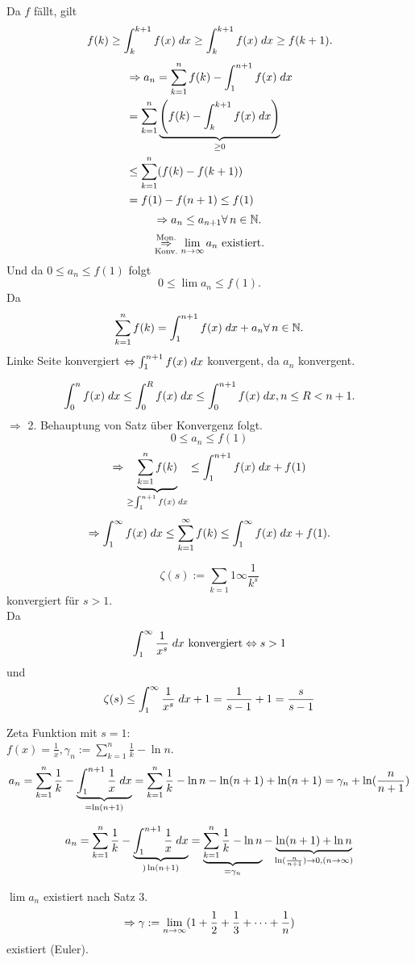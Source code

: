 \documentclass[../ana2.tex]{subfiles}
\begin{document}
\begin{bew}
    Da \(f\) fällt, gilt 
    \[ f(k) \geq \integral{f(x)}{k}{k+1} 
    \geq \integral{f(x)}{k}{k+1} 
    \geq f(k+1). \]
    \begin{align*}
        &\Rightarrow a_n = \sum_{k=1}^n f(k) 
        - \integral{f(x)}{1}{n+1} \\
        &= \sum_{k=1}^n 
        \underbrace{\left( f(k) - \integral{f(x)}{k}{k+1} \right)}
        _{\geq 0} \\
        &\leq \sum_{k=1}^n (f(k)-f(k+1)) \\
        &= f(1) - f(n+1) \leq f(1)
    \end{align*}
    \[ \Rightarrow a_n \leq a_{n+1} \forall n\in\N. \]
    \[ \overundersett{Mon.}{Konv.}{\Rightarrow} 
    \limes{n} a_n \text{ existiert}. \]
    Und da \( 0 \leq a_n \leq f(1) \) folgt 
    \[ 0 \leq \lim a_n \leq f(1). \]
    Da \[ \sum_{k=1}^n f(k) 
    = \integral{f(x)}{1}{n+1} + a_n \forall n\in\N. \]
    Linke Seite konvergiert 
    \( \Leftrightarrow \integral{f(x)}{1}{n+1} \) konvergent, 
    da \( a_n \) konvergent.

    \[ \integral{f(x)}{0}{n} \leq \integral{f(x)}{0}{R} 
    \leq \integral{f(x)}{0}{n+1}, n\leq R < n+1. \]
    \( \Rightarrow \) 2. Behauptung von Satz über Konvergenz 
    folgt.
    \[ 0 \leq a_n \leq f(1) \]
    \[ \Rightarrow \underbrace{\sum_{k=1}^n f(k)}
    _{\geq \integral{f(x)}{1}{n+1}}
    \leq \integral{f(x)}{1}{n+1} + f(1) \]
    \[ \Rightarrow \integral{f(x)}{1}{\infty} 
    \leq \sum_{k=1}^\infty f(k) 
    \leq \integral{f(x)}{1}{\infty} + f(1). \]
\end{bew}
\begin{bsp}
    \[ \zeta(s) := \sum_{k=1}1\infty \frac{1}{k^s} \]
    konvergiert für \(s>1\). \\
    Da
    \[ \integral{\frac{1}{x^s}}{1}{\infty} \text{ konvergiert}
    \Leftrightarrow s > 1  \]
    und 
    \[ \zeta(s) \leq \integral{\frac{1}{x^s}}{1}{\infty} + 1
    = \frac{1}{s-1} + 1 = \frac{s}{s-1} \]
\end{bsp}
\begin{bsp}
    Zeta Funktion mit \(s = 1\): \\
    \( f(x) = \frac{1}{x}, 
    \gamma_n := \sum_{k=1}^n \frac{1}{k} - \ln n \).
    \[ a_n = \sum_{k=1}^n \frac{1}{k} 
    - \underbrace{\integral{\frac{1}{x}}{1}{n+1}}_{=\ln(n+1)} 
    = \sum_{k=1}^n \frac{1}{k} - \ln n 
    - \ln(n+1) + \ln(n+1) = \gamma_n + \ln(\frac{n}{n+1}) \]

    \[ a_n = \sum_{k=1}^n \frac{1}{k} - 
    \underbrace{\integral{\frac{1}{x}}{1}{n+1}}_{) \ln(n+1)}
    = \underbrace{\sum_{k=1}^n \frac{1}{k} - \ln n}_{= \gamma_n}
    - \underbrace{\ln(n+1) + \ln n}
    _{\ln (\frac{n}{n+1}) \rightarrow 0, (n\rightarrow \infty)} \]

    \( \lim a_n \) existiert nach Satz 3.
    \[ \Rightarrow \gamma := 
    \limes{n} (1+ \frac{1}{2} + \frac{1}{3} + \dots + \frac{1}{n}) \]
    existiert (Euler).
\end{bsp}
\end{document}
